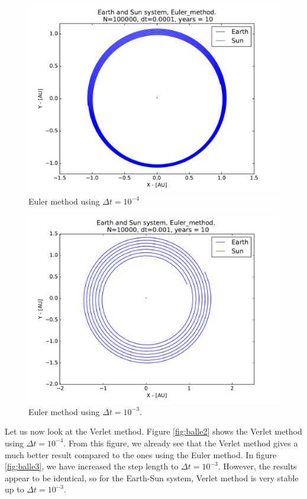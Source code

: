 \documentclass[12pt]{article}
\begin{document}
\begin{figure}[!h]
\centering
\includegraphics[width=\linewidth]{Plots/Earth_Sun_Euler_method.pdf}
\caption{Euler method using $\Delta t = 10^{-4}$}
\label{fig:balle}
\end{figure}

\begin{figure}[!h]
\centering
\includegraphics[width=\linewidth]{Plots/Earth_Sun_Euler_method_larger_dt.pdf}
\caption{Euler method using $\Delta t = 10^{-3}$.}
\label{fig:balle1}
\end{figure}

Let us now look at the Verlet method. Figure \ref{fig:balle2} shows the Verlet method using $\Delta t = 10^{-4}$. From this figure, we already see that the Verlet method gives a much better result compared to the ones using the Euler method. In figure \ref{fig:balle3}, we have increased the step length to $\Delta t = 10^{-3}$. However, the results appear to be identical, so for the Earth-Sun system, Verlet method is very stable up to $\Delta t = 10^{-3}$. 
\end{document}
